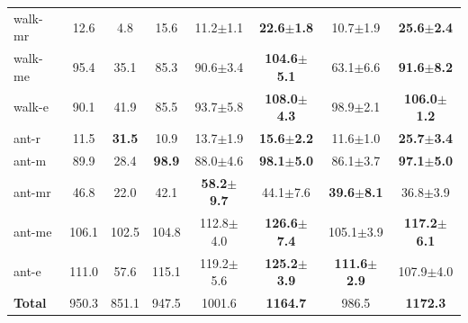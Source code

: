 \documentclass[11pt]{article}
\begin{document}
\begin{table}[htbp]
{\begin{tabular}{l|ccc|cc|cc}
    walk-mr & 12.6 & 4.8 & 15.6 & 11.2$\pm$1.1 & \textbf{22.6$\pm$1.8} & 10.7$\pm$1.9 & \textbf{25.6$\pm$2.4} \\
    walk-me & 95.4 & 35.1 & 85.3 & 90.6$\pm$3.4 & \textbf{104.6$\pm$5.1} & 63.1$\pm$6.6 & \textbf{91.6$\pm$8.2} \\
    walk-e & 90.1 & 41.9 & 85.5 & 93.7$\pm$5.8 & \textbf{108.0$\pm$4.3} & 98.9$\pm$2.1 & \textbf{106.0$\pm$1.2} \\
    ant-r & 11.5 & \textbf{31.5} & 10.9 & 13.7$\pm$1.9 & \textbf{15.6$\pm$2.2} & 11.6$\pm$1.0 & \textbf{25.7$\pm$3.4} \\
    ant-m & 89.9 & 28.4 & \textbf{98.9} & 88.0$\pm$4.6 & \textbf{98.1$\pm$5.0} & 86.1$\pm$3.7 & \textbf{97.1$\pm$5.0} \\
    ant-mr & 46.8 & 22.0 & 42.1 & \textbf{58.2$\pm$9.7} & 44.1$\pm$7.6 & \textbf{39.6$\pm$8.1} & 36.8$\pm$3.9 \\
    ant-me & 106.1 & 102.5 & 104.8 & 112.8$\pm$4.0 & \textbf{126.6$\pm$7.4} & 105.1$\pm$3.9 & \textbf{117.2$\pm$6.1} \\
    ant-e & 111.0 & 57.6 & 115.1 & 119.2$\pm$5.6 & \textbf{125.2$\pm$3.9} & \textbf{111.6$\pm$2.9} & 107.9$\pm$4.0 \\ 
    \midrule
    \textbf{Total} & 950.3 & 851.1 & 947.5 & 1001.6 & \textbf{1164.7} & 986.5 & \textbf{1172.3} \\ 
    \bottomrule
    \end{tabular}
}
\end{table}
\end{document}

